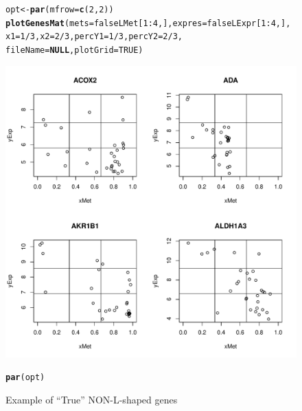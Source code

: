 \documentclass[a4paper,10pt]{article}\usepackage[]{graphicx}\usepackage[]{color}
\makeatletter
\def\maxwidth{ %
  \ifdim\Gin@nat@width>\linewidth
    \linewidth
  \else
    \Gin@nat@width
  \fi
}
\newcommand{\hlnum}[1]{\textcolor[rgb]{0.686,0.059,0.569}{#1}}%
\newcommand{\hlopt}[1]{\textcolor[rgb]{0,0,0}{#1}}%
\newcommand{\hlstd}[1]{\textcolor[rgb]{0.345,0.345,0.345}{#1}}%
\newcommand{\hlkwa}[1]{\textcolor[rgb]{0.161,0.373,0.58}{\textbf{#1}}}%
\newcommand{\hlkwb}[1]{\textcolor[rgb]{0.69,0.353,0.396}{#1}}%
\newcommand{\hlkwc}[1]{\textcolor[rgb]{0.333,0.667,0.333}{#1}}%
\newcommand{\hlkwd}[1]{\textcolor[rgb]{0.737,0.353,0.396}{\textbf{#1}}}%
\newenvironment{kframe}{%
 \def\at@end@of@kframe{}%
 \ifinner\ifhmode%
  \def\at@end@of@kframe{\end{minipage}}%
  \begin{minipage}{\columnwidth}%
 \fi\fi%
 \def\FrameCommand##1{\hskip\@totalleftmargin \hskip-\fboxsep
 \colorbox{shadecolor}{##1}\hskip-\fboxsep
     \hskip-\linewidth \hskip-\@totalleftmargin \hskip\columnwidth}%
 \MakeFramed {\advance\hsize-\width
   \@totalleftmargin\z@ \linewidth\hsize
   \@setminipage}}%
 {\par\unskip\endMakeFramed%
 \at@end@of@kframe}
\newenvironment{knitrout}{}{} %
\makeatother
\begin{document}
\begin{figure}
\centering
\begin{knitrout}
\color{fgcolor}\begin{kframe}
\begin{alltt}
\hlstd{opt}\hlkwb{<-} \hlkwd{par}\hlstd{(}\hlkwc{mfrow}\hlstd{=}\hlkwd{c}\hlstd{(}\hlnum{2}\hlstd{,}\hlnum{2}\hlstd{))}
\hlkwd{plotGenesMat} \hlstd{(}\hlkwc{mets}\hlstd{=falseLMet[}\hlnum{1}\hlopt{:}\hlnum{4}\hlstd{,],} \hlkwc{expres}\hlstd{=falseLExpr[}\hlnum{1}\hlopt{:}\hlnum{4}\hlstd{,],}
              \hlkwc{x1}\hlstd{=}\hlnum{1}\hlopt{/}\hlnum{3}\hlstd{,} \hlkwc{x2}\hlstd{=}\hlnum{2}\hlopt{/}\hlnum{3}\hlstd{,} \hlkwc{percY1}\hlstd{=}\hlnum{1}\hlopt{/}\hlnum{3}\hlstd{,} \hlkwc{percY2}\hlstd{=}\hlnum{2}\hlopt{/}\hlnum{3}\hlstd{,}
               \hlkwc{fileName}\hlstd{=}\hlkwa{NULL}\hlstd{,} \hlkwc{plotGrid} \hlstd{=} \hlnum{TRUE}\hlstd{)}
\end{alltt}
\end{kframe}
\includegraphics[width=\maxwidth]{figure/plotFALSE1-1} 
\begin{kframe}\begin{alltt}
\hlkwd{par}\hlstd{(opt)}
\end{alltt}
\end{kframe}
\end{knitrout}
\caption{Example of ``True'' NON-L-shaped genes\label{Lshaped2}}
\end{figure}
\end{document}
